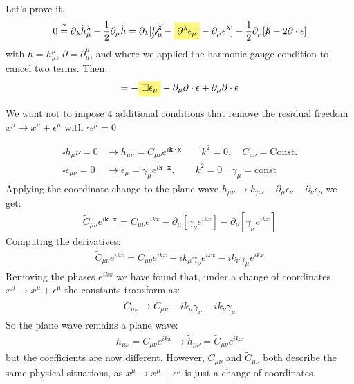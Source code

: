 \documentclass[../template.tex]{subfiles}
\begin{document}
Let's prove it.
\begin{align*}
    0 \overset{?}{=} \partial_\lambda \tilde{h}^\lambda_\mu - \frac{1}{2} \partial_\mu \tilde{h} = \partial_\lambda [\cancel{h^\lambda_\mu }- \hlc{Yellow}{\partial^\lambda \epsilon_\mu }- \partial_\mu \epsilon^\lambda] - \frac{1}{2} \partial_\mu [\cancel{h} - 2 \partial \cdot \epsilon]  
\end{align*}
with $h = h^\mu_\mu$, $\partial = \partial^\mu_\mu$, and where we applied the harmonic gauge condition to cancel two terms. 
Then:
\begin{align*}
    = -\hlc{Yellow}{ \square \epsilon_\mu} - \partial_\mu \partial \cdot \epsilon + \partial_\mu \partial \cdot \epsilon
\end{align*}

We want not to impose $4$ additional conditions that remove the residual freedom $x^\mu \to x^\mu + \epsilon^\mu$ with $\square \epsilon^\mu = 0$

\begin{align*}
    \square h_\mu \nu = 0 & \to h_{\mu \nu} = C_{\mu \nu} e^{i \bm{k}\cdot \bm{x}} \qquad k^2 = 0, \quad C_{\mu \nu} = \text{Const.}\\
    \square \epsilon_{\mu \nu} = 0 & \to \epsilon_\mu = \gamma_\mu e^{i \bm{k}\cdot \bm{x}}, \qquad k^2 = 0 \quad \gamma_\mu = \text{const}
\end{align*}
Applying the coordinate change to the plane wave $h_{\mu \nu} \to \tilde{h}_{\mu \nu} - \partial_\mu \epsilon_\nu - \partial_\nu \epsilon_\mu$ we get:
\begin{align*}
    \tilde{C}_{\mu \nu} e^{i \bm{k}\cdot \bm{x}} = C_{\mu \nu} e^{ikx} - \partial_\mu [\gamma_\nu e^{ikx}] - \partial_\nu [\gamma_\mu e^{ikx}]
\end{align*}
Computing the derivatives:
\begin{align*}
    \tilde{C}_{\mu \nu} e^{ikx} = C_{\mu \nu} e^{ikx} - ik_\mu \gamma_\nu e^{ikx} - ik_\nu \gamma_\mu e^{ikx}  
\end{align*}
Removing the phases $e^{ikx}$ we have found that, under a change of coordinates $x^\mu \to x^\mu + \epsilon^\mu$ the constants transform as:
\begin{align*}
    C_{\mu \nu} \to \tilde{C}_{\mu \nu} - ik_\mu \gamma_\nu - ik_\nu \gamma_\mu
\end{align*}
So the plane wave remains a plane wave:
\begin{align*}
    h_{\mu \nu} = C_{\mu \nu} e^{ikx} \to \tilde{h}_{\mu \nu} = \tilde{C}_{\mu \nu} e^{ikx}
\end{align*}
but the coefficients are now different. However, $C_{\mu \nu}$ and $\tilde{C}_{\mu \nu}$ both describe the same physical situations, as $x^\mu \to x^\mu + \epsilon^\mu$ is just a change of coordinates. 
\end{document}
